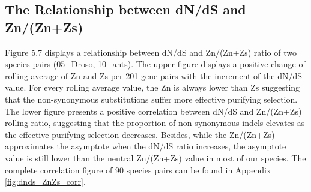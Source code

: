 \subsection{The Relationship between dN/dS and Zn/(Zn+Zs)}
Figure 5.7 displays a relationship between dN/dS and Zn/(Zn+Zs) ratio of two species pairs (05\_Droso, 10\_ants). The upper figure displays a positive change of rolling average of Zn and Zs per 201 gene pairs with the increment of the dN/dS value. For every rolling average value, the Zn is always lower than Zs suggesting that the non-synonymous substitutions suffer more effective purifying selection. The lower figure presents a positive correlation between dN/dS and Zn/(Zn+Zs) rolling ratio, suggesting that the proportion of non-synonymous indels elevates as the effective purifying selection decreases. Besides, while the Zn/(Zn+Zs) approximates the asymptote when the dN/dS ratio increases, the asymptote value is still lower than the neutral Zn/(Zn+Zs) value in most of our species. The complete correlation figure of 90 species pairs can be found in Appendix  \ref{fig:dnds_ZnZs_corr}.  
